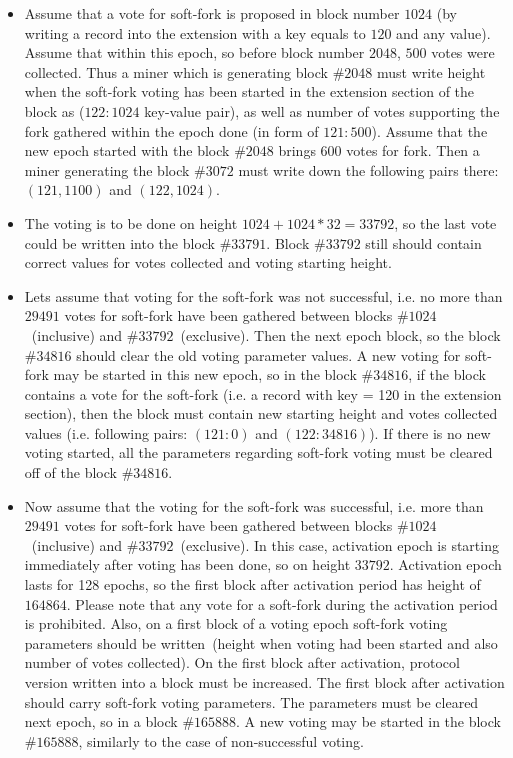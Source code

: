 \begin{itemize}
    \item{} Assume that a vote for soft-fork is proposed in block number $1024$ (by writing a record into the extension
            with a key equals to $120$ and any value). Assume that within this epoch,
            so before block number $2048$, $500$ votes were collected. Thus a miner which is generating block
            $\#2048$ must write height when the soft-fork voting has been started in the extension section of the block
            as ($122: 1024$ key-value pair), as well as number of votes supporting the fork gathered within the epoch
            done (in form of $121: 500$). Assume that the new epoch started with the block $\#2048$ brings 600 votes for
            fork. Then a miner generating the block $\#3072$ must write down the following pairs there: $(121, 1100)$ and
            $(122, 1024)$.
    \item{} The voting is to be done on height $1024 + 1024*32 = 33792$, so the last vote could be written into the
            block $\#33791$. Block $\#33792$ still should contain correct values for votes collected and voting starting
            height.
    \item{} Lets assume that voting for the soft-fork was not successful, i.e. no more than $29491$ votes for soft-fork
            have been gathered between blocks $\#1024$~(inclusive) and $\#33792$~(exclusive). Then the next epoch block,
            so the block $\#34816$ should clear the old voting parameter values. A new voting for soft-fork may be
            started in this new epoch, so in the block $\#34816$, if the block contains a vote for the soft-fork
            (i.e. a record with key = 120 in the extension section), then the block must contain new starting height
            and votes collected values (i.e. following pairs: $(121: 0)$ and $(122: 34816)$). If there is no new voting
            started, all the parameters regarding soft-fork voting must be cleared off of the block $\#34816$.
    \item{} Now assume that the voting for the soft-fork was successful, i.e. more than $29491$ votes for soft-fork
            have been gathered between blocks $\#1024$~(inclusive) and $\#33792$~(exclusive). In this case, activation
            epoch is starting immediately after voting has been done, so on height $33792$. Activation epoch lasts for
            128 epochs, so the first block after activation period has height of $164864$. Please note that any vote
            for a soft-fork during the activation period is prohibited. Also, on a first block of a voting epoch
            soft-fork voting parameters should be written~(height when voting had been started and also number of votes
            collected). On the first block after activation, protocol version written into a block must be increased.
            The first block after activation should carry soft-fork voting parameters. The parameters must be cleared
            next epoch, so in a block $\#165888$. A new voting may be started in the block $\#165888$, similarly to the
            case of non-successful voting.
\end{itemize}
